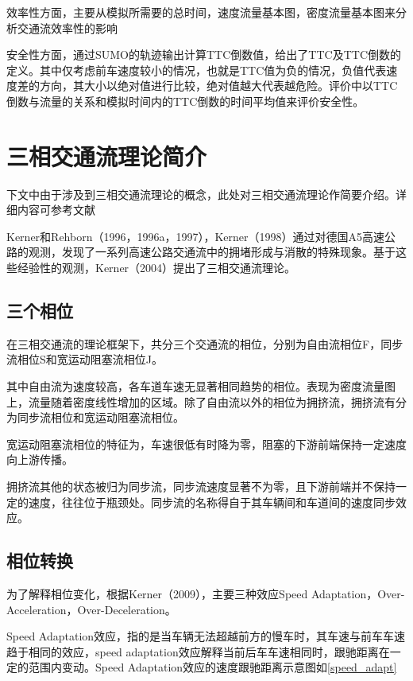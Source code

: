 效率性方面，主要从模拟所需要的总时间，速度流量基本图，密度流量基本图来分析交通流效率性的影响



安全性方面，通过SUMO的轨迹输出计算TTC倒数值，给出了TTC及TTC倒数的定义。其中仅考虑前车速度较小的情况，也就是TTC值为负的情况，负值代表速度差的方向，其大小以绝对值进行比较，绝对值越大代表越危险。评价中以TTC倒数与流量的关系和模拟时间内的TTC倒数的时间平均值来评价安全性。


\section{三相交通流理论简介}
下文中由于涉及到三相交通流理论的概念，此处对三相交通流理论作简要介绍。详细内容可参考文献\citet{S.Kerner2009}

Kerner和Rehborn（1996，1996a，1997）\cite{Kerner1996,Kerner1996a,Kerner1997}，Kerner（1998）\cite{Kerner1998}通过对德国A5高速公路的观测，发现了一系列高速公路交通流中的拥堵形成与消散的特殊现象。基于这些经验性的观测，Kerner（2004）\cite{Kerner2004}提出了三相交通流理论。

\subsection{三个相位}
在三相交通流的理论框架下，共分三个交通流的相位，分别为自由流相位F，同步流相位S和宽运动阻塞流相位J。

其中自由流为速度较高，各车道车速无显著相同趋势的相位。表现为密度流量图上，流量随着密度线性增加的区域。除了自由流以外的相位为拥挤流，拥挤流有分为同步流相位和宽运动阻塞流相位。

宽运动阻塞流相位的特征为，车速很低有时降为零，阻塞的下游前端保持一定速度向上游传播。

拥挤流其他的状态被归为同步流，同步流速度显著不为零，且下游前端并不保持一定的速度，往往位于瓶颈处。同步流的名称得自于其车辆间和车道间的速度同步效应。



\subsection{相位转换}
为了解释相位变化，根据Kerner（2009）\cite{S.Kerner2009}，主要三种效应Speed Adaptation，Over-Acceleration，Over-Deceleration。

Speed Adaptation效应，指的是当车辆无法超越前方的慢车时，其车速与前车车速趋于相同的效应，speed adaptation效应解释当前后车车速相同时，跟驰距离在一定的范围内变动。Speed Adaptation效应的速度跟驰距离示意图如\autoref{speed_adapt}

